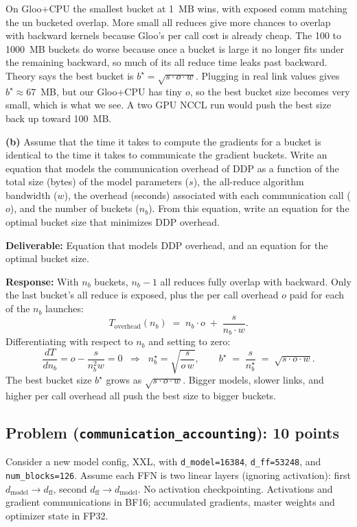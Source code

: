 \documentclass[11pt]{article}
\begin{document}
\noindent On Gloo+CPU the smallest bucket at 1~MB wins, with exposed comm matching the un bucketed overlap. More small all reduces give more chances to overlap with backward kernels because Gloo's per call cost is already cheap. The 100 to 1000~MB buckets do worse because once a bucket is large it no longer fits under the remaining backward, so much of its all reduce time leaks past backward. Theory says the best bucket is $b^\star = \sqrt{s \cdot o \cdot w}$. Plugging in real link values gives $b^\star \approx 67$~MB, but our Gloo+CPU has tiny $o$, so the best bucket size becomes very small, which is what we see. A two GPU NCCL run would push the best size back up toward 100~MB.

\textbf{(b)} Assume that the time it takes to compute the gradients for a bucket is identical to the time it takes to communicate the gradient buckets. Write an equation that models the communication overhead of DDP as a function of the total size (bytes) of the model parameters ($s$), the all-reduce algorithm bandwidth ($w$), the overhead (seconds) associated with each communication call ($o$), and the number of buckets ($n_b$). From this equation, write an equation for the optimal bucket size that minimizes DDP overhead.

\textbf{Deliverable:} Equation that models DDP overhead, and an equation for the optimal bucket size.

\textbf{Response:}
With $n_b$ buckets, $n_b - 1$ all reduces fully overlap with backward. Only the last bucket's all reduce is exposed, plus the per call overhead $o$ paid for each of the $n_b$ launches:
\[
T_\text{overhead}(n_b) \;=\; n_b \cdot o \;+\; \frac{s}{n_b \cdot w}.
\]
Differentiating with respect to $n_b$ and setting to zero:
\[
\frac{dT}{dn_b} = o - \frac{s}{n_b^2 w} = 0 \;\;\Longrightarrow\;\; n_b^\star = \sqrt{\frac{s}{o \, w}}, \qquad b^\star \;=\; \frac{s}{n_b^\star} \;=\; \sqrt{s \cdot o \cdot w}.
\]
The best bucket size $b^\star$ grows as $\sqrt{s \cdot o \cdot w}$. Bigger models, slower links, and higher per call overhead all push the best size to bigger buckets.

\subsection*{Problem (\texttt{communication\_accounting}): 10 points}

Consider a new model config, XXL, with \texttt{d\_model=16384}, \texttt{d\_ff=53248}, and \texttt{num\_blocks=126}. Assume each FFN is two linear layers (ignoring activation): first $d_{\text{model}} \to d_{\text{ff}}$, second $d_{\text{ff}} \to d_{\text{model}}$. No activation checkpointing. Activations and gradient communications in BF16; accumulated gradients, master weights and optimizer state in FP32.
\end{document}
